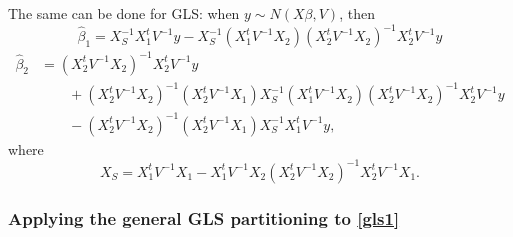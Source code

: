 \documentclass[12pt]{article}
\begin{document}
The same can be done for GLS: when $y \sim N(X \beta, V)$, then 
\begin{equation} \label{gls2}
\hat \beta_1 = X_S^{-1} X_1^t V^{-1} y   - X_S^{-1} (X_1^t V^{-1} X_2) (X_2^t V^{-1} X_2)^{-1} X_2^t V^{-1} y
\end{equation}
\begin{equation}\label{gls3}
\begin{split}
\hat \beta_2 & = (X_2^t V^{-1} X_2)^{-1} X_2^t V^{-1} y \\
&\qquad  + (X_2^t V^{-1} X_2)^{-1} (X_2^t V^{-1} X_1) X_S^{-1} (X_1^t V^{-1} X_2) (X_2^t V^{-1} X_2)^{-1} X_2^t V^{-1} y \\
&\qquad  - (X_2^t V^{-1} X_2)^{-1} (X_2^t V^{-1} X_1) X_S^{-1} X_1^t V^{-1} y,
\end{split}
\end{equation}
%
where 
\begin{equation} \label{gls4}
X_S = X_1^t V^{-1} X_1 - X_1^t V^{-1} X_2 (X_2^t V^{-1} X_2)^{-1} X_2^t V^{-1} X_1.
\end{equation}

\subsubsection{Applying the general GLS partitioning to \eqref{gls1}}
\end{document}
